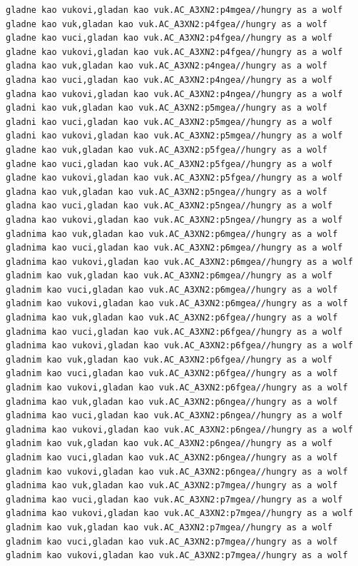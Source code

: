\begin{verbatim}
gladne kao vukovi,gladan kao vuk.AC_A3XN2:p4mgea//hungry as a wolf
gladne kao vuk,gladan kao vuk.AC_A3XN2:p4fgea//hungry as a wolf
gladne kao vuci,gladan kao vuk.AC_A3XN2:p4fgea//hungry as a wolf
gladne kao vukovi,gladan kao vuk.AC_A3XN2:p4fgea//hungry as a wolf
gladna kao vuk,gladan kao vuk.AC_A3XN2:p4ngea//hungry as a wolf
gladna kao vuci,gladan kao vuk.AC_A3XN2:p4ngea//hungry as a wolf
gladna kao vukovi,gladan kao vuk.AC_A3XN2:p4ngea//hungry as a wolf
gladni kao vuk,gladan kao vuk.AC_A3XN2:p5mgea//hungry as a wolf
gladni kao vuci,gladan kao vuk.AC_A3XN2:p5mgea//hungry as a wolf
gladni kao vukovi,gladan kao vuk.AC_A3XN2:p5mgea//hungry as a wolf
gladne kao vuk,gladan kao vuk.AC_A3XN2:p5fgea//hungry as a wolf
gladne kao vuci,gladan kao vuk.AC_A3XN2:p5fgea//hungry as a wolf
gladne kao vukovi,gladan kao vuk.AC_A3XN2:p5fgea//hungry as a wolf
gladna kao vuk,gladan kao vuk.AC_A3XN2:p5ngea//hungry as a wolf
gladna kao vuci,gladan kao vuk.AC_A3XN2:p5ngea//hungry as a wolf
gladna kao vukovi,gladan kao vuk.AC_A3XN2:p5ngea//hungry as a wolf
gladnima kao vuk,gladan kao vuk.AC_A3XN2:p6mgea//hungry as a wolf
gladnima kao vuci,gladan kao vuk.AC_A3XN2:p6mgea//hungry as a wolf
gladnima kao vukovi,gladan kao vuk.AC_A3XN2:p6mgea//hungry as a wolf
gladnim kao vuk,gladan kao vuk.AC_A3XN2:p6mgea//hungry as a wolf
gladnim kao vuci,gladan kao vuk.AC_A3XN2:p6mgea//hungry as a wolf
gladnim kao vukovi,gladan kao vuk.AC_A3XN2:p6mgea//hungry as a wolf
gladnima kao vuk,gladan kao vuk.AC_A3XN2:p6fgea//hungry as a wolf
gladnima kao vuci,gladan kao vuk.AC_A3XN2:p6fgea//hungry as a wolf
gladnima kao vukovi,gladan kao vuk.AC_A3XN2:p6fgea//hungry as a wolf
gladnim kao vuk,gladan kao vuk.AC_A3XN2:p6fgea//hungry as a wolf
gladnim kao vuci,gladan kao vuk.AC_A3XN2:p6fgea//hungry as a wolf
gladnim kao vukovi,gladan kao vuk.AC_A3XN2:p6fgea//hungry as a wolf
gladnima kao vuk,gladan kao vuk.AC_A3XN2:p6ngea//hungry as a wolf
gladnima kao vuci,gladan kao vuk.AC_A3XN2:p6ngea//hungry as a wolf
gladnima kao vukovi,gladan kao vuk.AC_A3XN2:p6ngea//hungry as a wolf
gladnim kao vuk,gladan kao vuk.AC_A3XN2:p6ngea//hungry as a wolf
gladnim kao vuci,gladan kao vuk.AC_A3XN2:p6ngea//hungry as a wolf
gladnim kao vukovi,gladan kao vuk.AC_A3XN2:p6ngea//hungry as a wolf
gladnima kao vuk,gladan kao vuk.AC_A3XN2:p7mgea//hungry as a wolf
gladnima kao vuci,gladan kao vuk.AC_A3XN2:p7mgea//hungry as a wolf
gladnima kao vukovi,gladan kao vuk.AC_A3XN2:p7mgea//hungry as a wolf
gladnim kao vuk,gladan kao vuk.AC_A3XN2:p7mgea//hungry as a wolf
gladnim kao vuci,gladan kao vuk.AC_A3XN2:p7mgea//hungry as a wolf
gladnim kao vukovi,gladan kao vuk.AC_A3XN2:p7mgea//hungry as a wolf

\end{verbatim}
